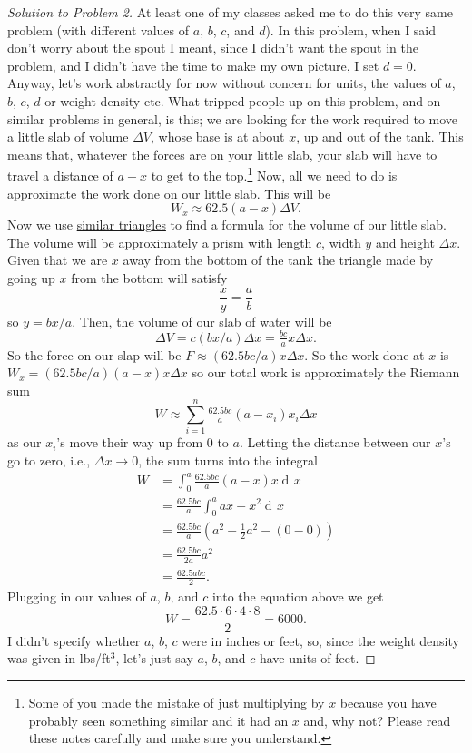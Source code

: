 \documentclass[12pt]{article}
\theoremstyle{plain}
\theoremstyle{definition}
\theoremstyle{remark}
\DeclareMathOperator{\diff}{d\!}
\begin{document}
\begin{proof}[Solution to Problem 2]
At least one of my classes asked me to do this very same problem (with
different values of $a$, $b$, $c$, and $d$). In this problem, when I said
don't worry about the spout I meant, since I didn't want the spout in the
problem, and I didn't have the time to make my own picture, I set
$d=0$. Anyway, let's work abstractly for now without concern for units, the
values of $a$, $b$, $c$, $d$ or weight-density etc. What tripped people up
on this problem, and on similar problems in general, is this; we are
looking for the work required to move a little slab of volume $\Delta V$,
whose base is at about $x$, up and out of the tank. This means that,
whatever the forces are on your little slab, your slab will have to travel
a distance of $a-x$ to get to the top.\footnote{Some of you made the
  mistake of just multiplying by $x$ because you have probably seen
  something similar and it had an $x$ and, why not? Please read these notes
  carefully and make sure you understand.} Now, all we need to do is
approximate the work done on our little slab. This will be
\[
W_x\approx 62.5(a-x)\Delta V.
\]
Now we use
\href{https://en.wikipedia.org/wiki/Similarity_(geometry)#Similar_triangles}{similar
  triangles} to find a formula for the volume of our little slab. The
volume will be approximately a prism with length $c$, width $y$ and height
$\Delta x$. Given that we are $x$ away from the bottom of the tank the
triangle made by going up $x$ from the bottom will satisfy
\[
\frac{x}{y}=\frac{a}{b}
\]
so $y=bx/a$. Then, the volume of our slab of water will be
\[
\Delta V=c(bx/a)\Delta x=\tfrac{bc}{a} x\Delta x.
\]
So the force on our slap will be $F\approx (62.5bc/a)x\Delta x$. So the
work done at $x$ is $W_x=(62.5 bc/a)(a-x)x\Delta x$ so our total work is
approximately the Riemann sum
\[
W\approx \sum_{i=1}^n\tfrac{62.5 bc}{a}(a-x_i)x_i\Delta x
\]
as our $x_i$'s move their way up from $0$ to $a$. Letting the distance
between our $x$'s go to zero, i.e., $\Delta x\to 0$, the sum turns into the
integral
\begin{align*}
W&=\int_0^a \tfrac{62.5 bc}{a}(a-x)x\diff x\\
&=\frac{62.5bc}{a}\int_0^aax-x^2\diff x\\
&=\frac{62.5bc}{a}\left(a^2-\tfrac{1}{2}a^2-(0-0)\right)\\
&=\frac{62.5bc}{2a}a^2\\
&=\boxed{\frac{62.5 abc}{2}.}
\end{align*}
Plugging in our values of $a$, $b$, and $c$ into the equation above we get
\[
\boxed{W=\frac{62.5\cdot 6\cdot 4\cdot 8}{2}=6000.}
\]
I didn't specify whether $a$, $b$, $c$ were in inches or feet, so, since
the weight density was given in lbs/ft$^3$, let's just say $a$, $b$, and
$c$ have units of feet.
\end{proof}
\end{document}
